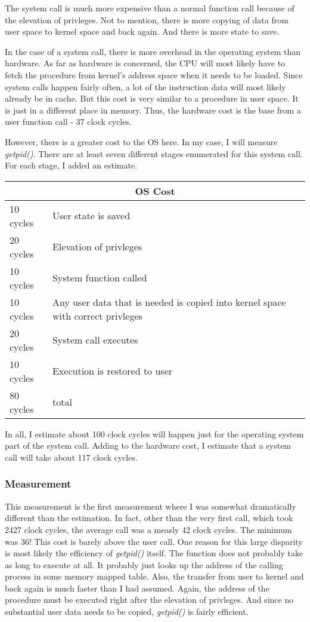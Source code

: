 \documentclass[paper=a4, fontsize=11pt]{scrartcl}
\numberwithin{equation}{section}        %
\numberwithin{figure}{section}          %
\numberwithin{table}{section}               %
\begin{document}
The system call is much more expensive than a normal function call because of the elevation of privleges.  Not to mention, there is more copying of data from user space to kernel space and back again.  And there is more state to save.

In the case of a system call, there is more overhead in the operating system than hardware.  As far as hardware is concerned, the CPU will most likely have to fetch the procedure from kernel's address space when it needs to be loaded.  Since system calls happen fairly often, a lot of the instruction data will most likely already be in cache.  But this cost is very similar to a procedure in user space.  It is just in a different place in memory.  Thus, the hardware cost is the base from a user function call - 37 clock cycles.

However, there is a greater cost to the OS here.  In my case, I will measure \textit{getpid()}.  There are at least seven different stages enumerated for this system call.  For each stage, I added an estimate.



\begin{tabular}{ |l|l| }
  \hline
  \multicolumn{2}{|c|}{OS Cost} \\
  \hline
  10 cycles & User state is saved \\
  20 cycles& Elevation of privleges \\
  10 cycles& System function called \\
  10 cycles& Any user data that is needed is copied into kernel space with correct privleges \\
  20 cycles& System call executes \\
  10 cycles& Execution is restored to user \\
  \hline
  80 cycles& total \\
  \hline
\end{tabular}


In all, I estimate about 100 clock cycles will happen just for the operating system part of the system call.  Adding to the hardware cost, I estimate that a system call will take about 117 clock cycles.

\subsubsection{Measurement}

This measurement is the first measurement where I was somewhat dramatically different than the estimation.  In fact, other than the very first call, which took 2427 clock cycles, the average call was a measly 42 clock cycles.  The minimum was 36!  This cost is barely above the user call.  One reason for this large disparity is most likely the efficiency of \textit{getpid()} itself.  The function does not probably take as long to execute at all.  It probably just looks up the address of the calling process in some memory mapped table.  Also, the transfer from user to kernel and back again is much faster than I had assumed.  Again, the address of the procedure must be executed right after the elevation of privleges.  And since no substantial user data needs to be copied, \textit{getpid()} is fairly efficient.
\end{document}

